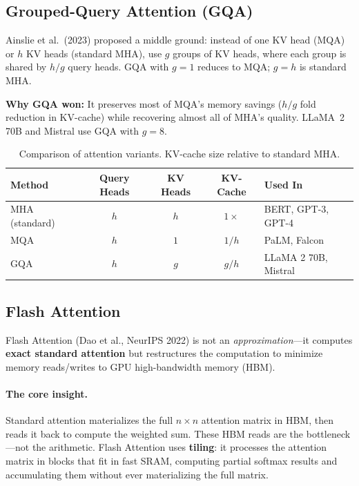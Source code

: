 \subsection{Grouped-Query Attention (GQA)}

Ainslie et al.\ (2023) proposed a middle ground: instead of one KV head
(MQA) or $h$ KV heads (standard MHA), use $g$ groups of KV heads, where each
group is shared by $h/g$ query heads.  GQA with $g = 1$ reduces to MQA;
$g = h$ is standard MHA.

\textbf{Why GQA won:} It preserves most of MQA's memory savings ($h/g$ fold
reduction in KV-cache) while recovering almost all of MHA's quality.  LLaMA~2
70B and Mistral use GQA with $g = 8$.

\begin{table}[H]
\centering
\small
\begin{tabularx}{\textwidth}{@{}l c c c X@{}}
\toprule
\textbf{Method} & \textbf{Query Heads} & \textbf{KV Heads} & \textbf{KV-Cache} & \textbf{Used In} \\
\midrule
MHA (standard)   & $h$  & $h$  & $1\times$                & BERT, GPT-3, GPT-4 \\
MQA              & $h$  & $1$  & $1/h$                    & PaLM, Falcon \\
GQA              & $h$  & $g$  & $g/h$                    & LLaMA 2 70B, Mistral \\
\bottomrule
\end{tabularx}
\caption{Comparison of attention variants.  KV-cache size relative to standard MHA.}
\label{tab:attention-variants}
\end{table}

\subsection{Flash Attention}

Flash Attention (Dao et al., NeurIPS 2022) is not an \emph{approximation}---it
computes \textbf{exact standard attention} but restructures the computation to
minimize memory reads/writes to GPU high-bandwidth memory (HBM).

\paragraph{The core insight.}
Standard attention materializes the full $n \times n$ attention matrix in HBM,
then reads it back to compute the weighted sum.  These HBM reads are the
bottleneck---not the arithmetic.  Flash Attention uses \textbf{tiling}: it
processes the attention matrix in blocks that fit in fast SRAM, computing
partial softmax results and accumulating them without ever materializing the
full matrix.

